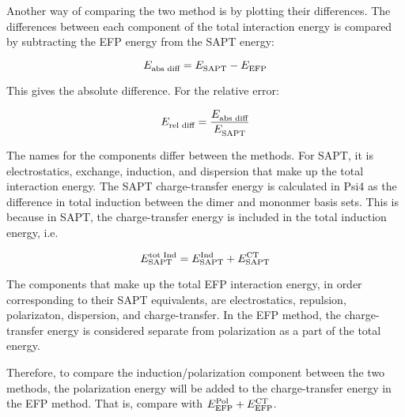 \begin{multicols}{2}

Another way of comparing the two method is by plotting their differences.
The differences between each component of the total interaction energy is compared by subtracting the EFP energy from the SAPT energy:

\begin{equation*}
    \energ{abs diff} = \energ{SAPT} - \energ{EFP}
\end{equation*}

This gives the absolute difference. 
For the relative error: 

\begin{equation*}
    \energ{rel diff} = \frac{ \energ{abs diff} } { \energ{SAPT} }
\end{equation*}


The names for the components differ between the methods. 
For SAPT, it is electrostatics, exchange, induction, and dispersion that make up the total interaction energy. 
The SAPT charge-transfer energy is calculated in Psi4 as the difference in total induction between the dimer and mononmer basis sets. 
This is because in SAPT, the charge-transfer energy is included in the total induction energy, i.e.

\begin{equation*}
    \energ[tot Ind]{SAPT} = \energ[Ind]{SAPT} + \energ[CT]{SAPT}
\end{equation*}


The components that make up the total EFP interaction energy, in order corresponding to their SAPT equivalents, are electrostatics, repulsion, polarizaton, dispersion, and charge-transfer. 
In the EFP method, the charge-transfer energy is considered separate from polarization as a part of the total energy. 

Therefore, to compare the induction/polarization component between the two methods, the polarization energy will be added to the charge-transfer energy in the EFP method. 
That is, compare 
 with
$ \energ[Pol]{EFP} + \energ[CT]{EFP} $.



\end{multicols}
